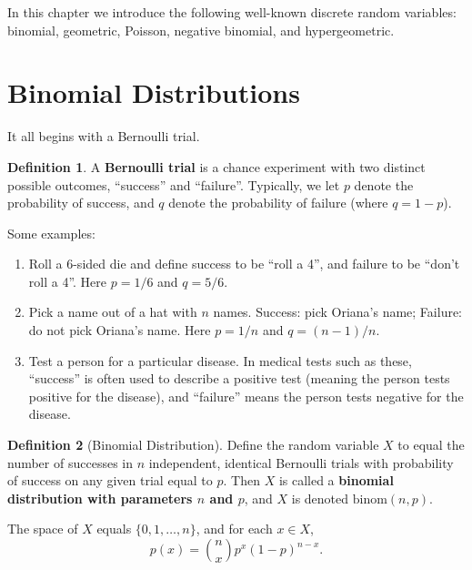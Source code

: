 \documentclass[
]{book}
\providecommand{\tightlist}{%
  \setlength{\itemsep}{0pt}\setlength{\parskip}{0pt}}
\theoremstyle{definition}
\newtheorem{definition}{Definition}[chapter]
\theoremstyle{definition}
\theoremstyle{definition}
\theoremstyle{definition}
\theoremstyle{remark}
\begin{document}
In this chapter we introduce the following well-known discrete random variables:
binomial, geometric, Poisson, negative binomial, and hypergeometric.

\section{Binomial Distributions}\label{binomial}

It all begins with a Bernoulli trial.

\begin{definition}
\protect\hypertarget{def:bernoulli-trial}{}\label{def:bernoulli-trial}A \textbf{Bernoulli trial} is a chance experiment with two distinct possible outcomes, ``success'' and ``failure''. Typically, we let \(p\) denote the probability of success, and \(q\) denote the probability of failure (where \(q = 1 - p\)).
\end{definition}

Some examples:

\begin{enumerate}
\def\labelenumi{\arabic{enumi}.}
\tightlist
\item
  Roll a 6-sided die and define success to be ``roll a 4'', and failure to be ``don't roll a 4''. Here \(p = 1/6\) and \(q = 5/6\).
\item
  Pick a name out of a hat with \(n\) names. Success: pick Oriana's name; Failure: do not pick Oriana's name. Here \(p = 1/n\) and \(q = (n-1)/n\).
\item
  Test a person for a particular disease. In medical tests such as these, ``success'' is often used to describe a positive test (meaning the person tests positive for the disease), and ``failure'' means the person tests negative for the disease.
\end{enumerate}

\begin{definition}[Binomial Distribution]
\protect\hypertarget{def:binomial-distribution}{}\label{def:binomial-distribution}Define the random variable \(X\) to equal the number of successes in \(n\) independent, identical Bernoulli trials with probability of success on any given trial equal to \(p\). Then \(X\) is called a \textbf{binomial distribution with parameters \(n\) and \(p\)}, and \(X\) is denoted \(\text{binom}(n,p)\).

The space of \(X\) equals \(\{0,1,\ldots,n\}\), and for each \(x \in X\),
\[p(x) = \binom{n}{x}p^x(1-p)^{n-x}.\]
\end{definition}
\end{document}
